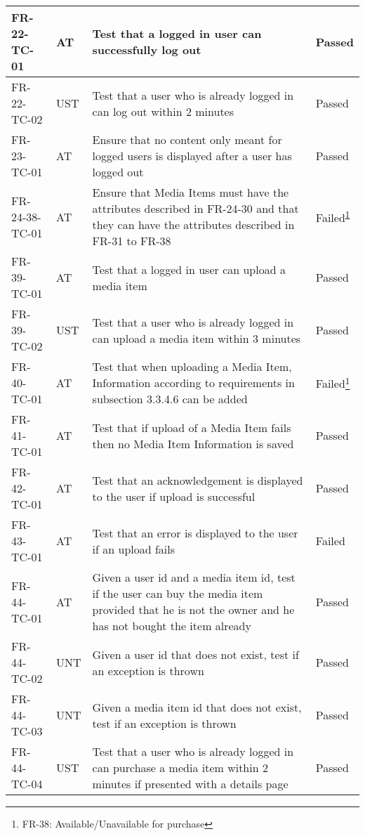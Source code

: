 \documentclass[../report.tex]{subfiles}
\newcommand{\footnoteref}[1]{\textsuperscript{\ref{#1}}}
\begin{document}
\begin{longtable}{|L{2.1cm}|L{0.8cm}|L{9cm}|L{1.2cm}|}
FR-22-TC-01&AT&Test that a logged in user can successfully log out&Passed  \\ \hline
FR-22-TC-02&UST&Test that a user who is already logged in can log out within 2 minutes&Passed  \\ \hline
FR-23-TC-01&AT&Ensure that no content only meant for logged users is displayed after a user has logged out&Passed  \\ \hline
FR-24-38-TC-01&AT&Ensure that Media Items must have the attributes described in FR-24-30 and that they can have the attributes described in FR-31 to FR-38&Failed\footnoteref{note1}  \\ \hline
FR-39-TC-01&AT&Test that a logged in user can upload a media item&Passed  \\ \hline
FR-39-TC-02&UST&Test that a user who is already logged in can upload a media item within 3 minutes&Passed  \\ \hline
FR-40-TC-01&AT&Test that when uploading a Media Item, Information according to requirements in subsection 3.3.4.6 can be added&Failed\footnote{\label{note1} FR-38: Available/Unavailable for purchase}  \\ \hline
FR-41-TC-01&AT&Test that if upload of a Media Item fails then no Media Item Information is saved&Passed  \\ \hline
FR-42-TC-01&AT&Test that an acknowledgement is displayed to the user if upload is successful&Passed  \\ \hline
FR-43-TC-01&AT&Test that an error is displayed to the user if an upload fails&Failed  \\ \hline
FR-44-TC-01&AT&Given a user id and a media item id, test if the user can buy the media item provided that he is not the owner and he has not bought the item already&Passed  \\ \hline
FR-44-TC-02&UNT&Given a user id that does not exist, test if an exception is thrown&Passed  \\ \hline
FR-44-TC-03&UNT&Given a media item id that does not exist, test if an exception is thrown&Passed  \\ \hline
FR-44-TC-04&UST&Test that a user who is already logged in can purchase a media item within 2 minutes if presented with a details page&Passed  \\ \hline

\end{longtable}
\end{document}
